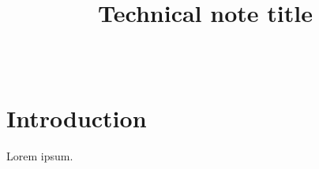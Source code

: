 \documentclass[TN]{spherex}
\title{Technical note title}
\author{
  \person[email=galileo@example.com]{Galileo~Galilei} \\
  \person{Isaac~Newton}
}
\begin{document}
\maketitle

\section{Introduction}

Lorem ipsum. \cite{SPHEREx_SPIE}


\end{document}
